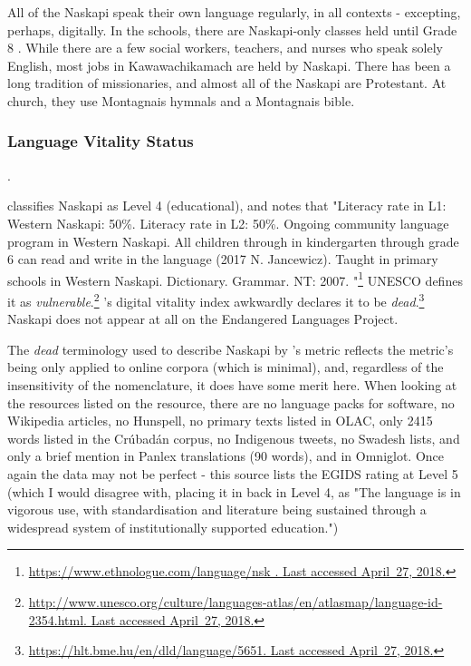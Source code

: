 All of the Naskapi speak their own language regularly, in all contexts - excepting, perhaps, digitally. In the schools, there are Naskapi-only classes held until Grade 8 \cite{llewellyn2017oral}. While there are a few social workers, teachers, and nurses who speak solely English, most jobs in Kawawachikamach are held by Naskapi. There has been a long tradition of missionaries, and almost all of the Naskapi are Protestant. At church, they use Montagnais hymnals and a Montagnais bible.



\subsubsection{Language Vitality Status}
\label{sec:naskapi-vitality-status}. 

\citet{lewis2009ethnologue} classifies Naskapi as Level 4 (educational), and notes that "Literacy rate in L1: Western Naskapi: 50\%. Literacy rate in L2: 50\%. Ongoing community language program in Western Naskapi. All children through in kindergarten through grade 6 can read and write in the language (2017 N. Jancewicz). Taught in primary schools in Western Naskapi. Dictionary. Grammar. NT: 2007. "\footnote{\href{https://www.ethnologue.com/language/nsk }{https://www.ethnologue.com/language/nsk . Last accessed April~27, 2018.}} UNESCO defines it as {\it vulnerable}.\footnote{\href{http://www.unesco.org/culture/languages-atlas/en/atlasmap/language-id-2354.html}{http://www.unesco.org/culture/languages-atlas/en/atlasmap/language-id-2354.html. Last accessed April~27, 2018.}} \citet{kornai2013digital}'s digital vitality index awkwardly declares it to be {\it dead}.\footnote{\href{https://hlt.bme.hu/en/dld/language/5651}{https://hlt.bme.hu/en/dld/language/5651. Last accessed April~27, 2018.}} Naskapi does not appear at all on the Endangered Languages Project. 

The {\it dead} terminology used to describe Naskapi by \citet{kornai2013digital}'s metric reflects the metric's being only applied to online corpora (which is minimal), and, regardless of the insensitivity of the nomenclature, it does have some merit here. When looking at the resources listed on the resource, there are no language packs for software, no Wikipedia articles, no Hunspell, no primary texts listed in OLAC, only 2415 words listed in the Cr\'ubad\'an corpus, no Indigenous tweets, no Swadesh lists, and only a brief mention in Panlex translations (90 words), and in Omniglot. Once again the data may not be perfect - this source lists the EGIDS rating at Level 5 (which I would disagree with, placing it in back in Level 4, as "The language is in vigorous use, with standardisation and literature being sustained through a widespread system of institutionally supported education.")

